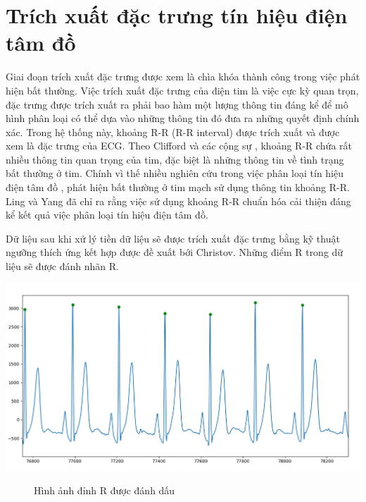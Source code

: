 \section{Trích xuất đặc trưng tín hiệu điện tâm đồ}
Giai đoạn trích xuất đặc trưng được xem là chìa khóa thành công trong việc phát hiện bất thường. Việc trích xuất đặc trưng của điện tim là việc cực kỳ quan trọn, đặc trưng được trích xuất ra phải bao hàm một lượng thông tin đáng kể để mô hình phân loại có thể dựa vào những thông tin đó đưa ra những quyết định chính xác. Trong hệ thống này, khoảng R-R (R-R interval) được trích xuất và được xem là đặc trưng của ECG. Theo Clifford và các cộng sự \cite{rr_clifford}, khoảng R-R chứa rất nhiều thông tin quan trọng của tim, đặc biệt là những thông tin về tình trạng bất thường ở tim. Chính vì thế nhiều nghiên cứu trong việc phân loại tín hiệu điện tâm đồ , phát hiện bất thường ở tim mạch sử dụng thông tin khoảng R-R. Ling và Yang \cite{Lin2013} đã chỉ ra rằng việc sử dụng khoảng R-R chuẩn hóa cải thiện đáng kể kết quả việc phân loại tín hiệu điện tâm đồ.\par
Dữ liệu sau khi xử lý tiền dữ liệu sẽ được trích xuất đặc trưng bằng kỹ thuật ngưỡng thích ứng kết hợp được đề xuất bới Christov. Những điểm R trong dữ liệu sẽ được đánh nhãn R.
\begin{center}
    \includegraphics[scale=.3]{image/chapter5/R_detect.png}
    \begin{figure}[htp]
    \begin{center}
    \end{center}
    \caption{Hình ảnh đỉnh R được đánh dấu}
    \end{figure}
\end{center}

